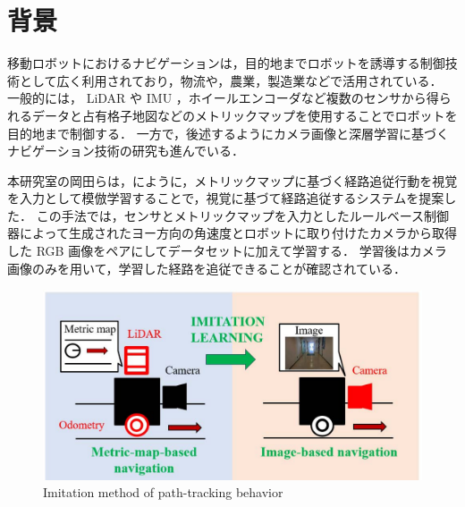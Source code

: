 
\section{背景}
移動ロボットにおけるナビゲーションは，目的地までロボットを誘導する制御技術として広く利用されており，物流や，農業，製造業などで活用されている．
一般的には， LiDAR や IMU ，ホイールエンコーダなど複数のセンサから得られるデータと占有格子地図などのメトリックマップを使用することでロボットを目的地まで制御する．
一方で，後述するようにカメラ画像と深層学習に基づくナビゲーション技術の研究も進んでいる．

本研究室の岡田ら\cite{okada2020}\cite{okada2021}は，にように，メトリックマップに基づく経路追従行動を視覚を入力として模倣学習することで，視覚に基づて経路追従するシステムを提案した．
この手法では，センサとメトリックマップを入力としたルールベース制御器によって生成されたヨー方向の角速度とロボットに取り付けたカメラから取得した RGB 画像をペアにしてデータセットに加えて学習する．
学習後はカメラ画像のみを用いて，学習した経路を追従できることが確認されている．
\begin{figure}[htbp]
     \centering
     \includegraphics[width=130mm]{images/pdf/ishiguro/system.pdf}
     \caption{Imitation method of path-tracking behavior}
     \label{fig:imitation_sys}
\end{figure}

